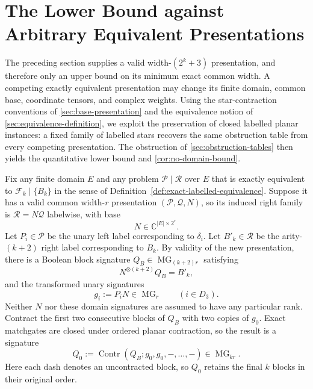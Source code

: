 \documentclass[11pt]{article}
\theoremstyle{definition}
\theoremstyle{remark}
\newcommand{\C}{\mathbb C}
\newcommand{\cF}{\mathcal F}
\newcommand{\cP}{\mathcal P}
\newcommand{\cR}{\mathcal R}
\newcommand{\MG}{\operatorname{MG}}
\newcommand{\Contr}{\operatorname{Contr}}
\begin{document}
\section{The Lower Bound against Arbitrary Equivalent Presentations}
\label{sec:arbitrary-equivalence}

The preceding section supplies a valid width-$(2^k+3)$ presentation, and
therefore only an upper bound on its minimum exact common width.  A competing
exactly equivalent presentation may change its finite domain, common base,
coordinate tensors, and complex weights.  Using the star-contraction
conventions of \cref{sec:base-presentation} and the equivalence notion of
\cref{sec:equivalence-definition}, we exploit the preservation of closed
labelled planar instances: a fixed family of labelled stars recovers the
same obstruction table from every competing presentation.  The obstruction
of \cref{sec:obstruction-tables} then yields the quantitative lower bound and
\cref{cor:no-domain-bound}.

Fix any finite domain $E$ and any problem $\cP\mid\cR$ over $E$ that is
exactly equivalent to $\cF_k\mid\{B_k\}$ in the sense of
Definition~\ref{def:exact-labelled-equivalence}.  Suppose it has a valid common width-$r$
presentation $(\cP,\mathcal Q,N)$, so its induced right family is
$\cR=N\mathcal Q$ labelwise, with base
\begin{equation}
  N\in\C^{|E|\times2^r}.
  \label{eq:arbitrary-new-base}
\end{equation}
Let $P_i\in\cP$ be the unary left label corresponding to $\delta_i$.  Let
$B'_k\in\cR$ be the arity-$(k+2)$ right label corresponding to $B_k$.  By
validity of the new presentation, there is a Boolean block signature
$Q_B\in\MG_{(k+2)r}$ satisfying
\begin{equation}
  N^{\otimes(k+2)}Q_B=B'_k,
  \label{eq:new-right-preimage}
\end{equation}
and the transformed unary signatures
\begin{equation}
  g_i:=P_i N\in\MG_r
  \qquad(i\in D_3).
  \label{eq:new-unary-matchgates}
\end{equation}
Neither $N$ nor these domain signatures are assumed to have any particular
rank.  Contract the first two consecutive blocks of $Q_B$ with two copies
of $g_0$.  Exact matchgates are closed under ordered planar contraction, so
the result is a signature
\begin{equation}
  Q_0:=\Contr(Q_B;g_0,g_0,-,\ldots,-)\in\MG_{kr}.
  \label{eq:pinned-right-preimage}
\end{equation}
Here each dash denotes an uncontracted block, so $Q_0$ retains the final
$k$ blocks in their original order.
\end{document}
